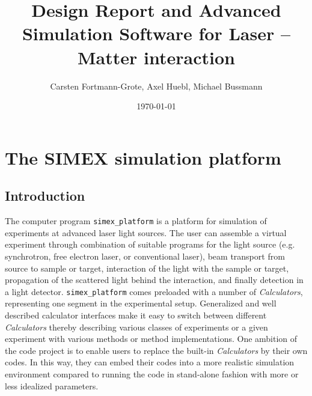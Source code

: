 \documentclass[a4paper]{article}
\title{Design Report and Advanced Simulation Software for Laser -- Matter interaction}
\author{Carsten Fortmann-Grote, Axel Huebl, Michael Bussmann } %
\date{\today}
\begin{document}
\maketitle
{}

\section{The SIMEX simulation platform \label{sec:simex_platform}}
%
\subsection{Introduction}
The computer program \texttt{simex\_platform}
\cite{simex_github}
is a platform for simulation of experiments at advanced laser light sources. The user can
assemble a virtual experiment through combination of suitable programs for the light source (e.g. synchrotron, free electron
laser, or conventional laser),
beam transport from source to sample or target, interaction of the light with the sample or target,
propagation of the scattered light behind the interaction, and finally detection in a light detector.
\texttt{simex\_platform} comes preloaded with
a number of \textit{Calculators}, representing one segment in the experimental setup.
Generalized and well described calculator interfaces make it easy to switch between different
\textit{Calculators} thereby describing various classes of experiments or a given experiment with various methods or method
implementations.
One ambition of the code project is to enable users to replace the built-in \textit{Calculators} by their own codes.
In this way, they can embed their codes
into a more realistic simulation environment compared to running the code in stand-alone fashion with more or less idealized parameters.
%
\end{document}
